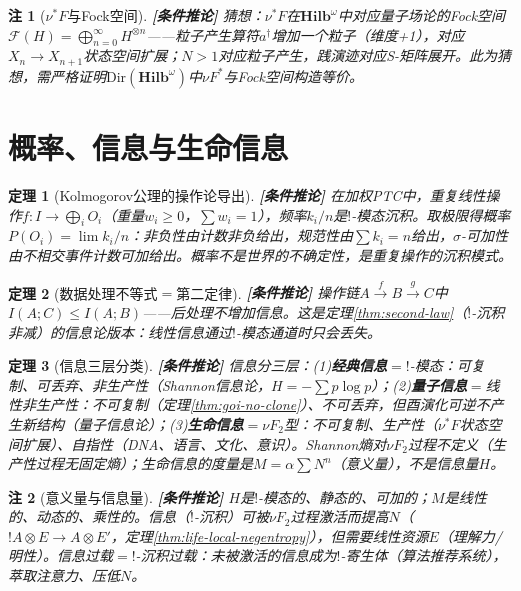 \documentclass[11pt,a4paper]{article}
\newtheorem{theorem}{定理}
\newtheorem{remark}{注}
\newcommand{\lvl}[1]{\hfill\textbf{\footnotesize[#1]}}
\newcommand{\lvC}{\lvl{条件推论}}
\newcommand{\bang}{{!}}
\begin{document}
\begin{remark}[$\nu^*F$与Fock空间]\lvC
猜想：$\nu^*F$在$\mathbf{Hilb}^\omega$中对应量子场论的Fock空间$\mathcal{F}(H)=\bigoplus_{n=0}^\infty H^{\otimes n}$——粒子产生算符$a^\dagger$增加一个粒子（维度+1），对应$X_n\to X_{n+1}$状态空间扩展；$N>1$对应粒子产生，践演迹对应S-矩阵展开。此为猜想，需严格证明$\mathrm{Dir}(\mathbf{Hilb}^\omega)$中$\nu F^*$与Fock空间构造等价。
\end{remark}


\section{概率、信息与生命信息}

\begin{theorem}[Kolmogorov公理的操作论导出]\label{thm:kolmogorov}\lvC
在加权PTC中，重复线性操作$f:I\to\bigoplus_i O_i$（重量$w_i\geq0$，$\sum w_i=1$），频率$k_i/n$是$\bang$-模态沉积。取极限得概率$P(O_i)=\lim k_i/n$：非负性由计数非负给出，规范性由$\sum k_i=n$给出，$\sigma$-可加性由不相交事件计数可加给出。概率不是世界的不确定性，是重复操作的沉积模式。
\end{theorem}

\begin{theorem}[数据处理不等式$=$第二定律]\label{thm:dpi}\lvC
操作链$A\xrightarrow{f}B\xrightarrow{g}C$中$I(A;C)\leq I(A;B)$——后处理不增加信息。这是定理\ref{thm:second-law}（$\bang$-沉积非减）的信息论版本：线性信息通过$\bang$-模态通道时只会丢失。
\end{theorem}

\begin{theorem}[信息三层分类]\label{thm:three-info}\lvC
信息分三层：(1)\textbf{经典信息}$=\bang$-模态：可复制、可丢弃、非生产性（Shannon信息论，$H=-\sum p\log p$）；(2)\textbf{量子信息}$=$线性非生产性：不可复制（定理\ref{thm:goi-no-clone}）、不可丢弃，但酉演化可逆不产生新结构（量子信息论）；(3)\textbf{生命信息}$=\nu F_2$型：不可复制、生产性（$\nu^*F$状态空间扩展）、自指性（DNA、语言、文化、意识）。Shannon熵对$\nu F_2$过程不定义（生产性过程无固定熵）；生命信息的度量是$M=\alpha\sum N^n$（意义量），不是信息量$H$。
\end{theorem}

\begin{remark}[意义量与信息量]\lvC
$H$是$\bang$-模态的、静态的、可加的；$M$是线性的、动态的、乘性的。信息（$\bang$-沉积）可被$\nu F_2$过程激活而提高$N$（$\bang A\otimes E\to A\otimes E'$，定理\ref{thm:life-local-negentropy}），但需要线性资源$E$（理解力/明性）。信息过载$=$$\bang$-沉积过载：未被激活的信息成为$\bang$-寄生体（算法推荐系统），萃取注意力、压低$N$。
\end{remark}
\end{document}
